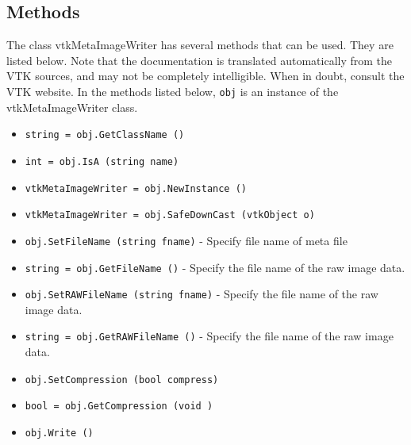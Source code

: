 \subsection{Methods}

The class vtkMetaImageWriter has several methods that can be used.
  They are listed below.
Note that the documentation is translated automatically from the VTK sources,
and may not be completely intelligible.  When in doubt, consult the VTK website.
In the methods listed below, \verb|obj| is an instance of the vtkMetaImageWriter class.
\begin{itemize}
\item  \verb|string = obj.GetClassName ()|

\item  \verb|int = obj.IsA (string name)|

\item  \verb|vtkMetaImageWriter = obj.NewInstance ()|

\item  \verb|vtkMetaImageWriter = obj.SafeDownCast (vtkObject o)|

\item  \verb|obj.SetFileName (string fname)| -  Specify file name of meta file

\item  \verb|string = obj.GetFileName ()| -  Specify the file name of the raw image data.

\item  \verb|obj.SetRAWFileName (string fname)| -  Specify the file name of the raw image data.

\item  \verb|string = obj.GetRAWFileName ()| -  Specify the file name of the raw image data.

\item  \verb|obj.SetCompression (bool compress)|

\item  \verb|bool = obj.GetCompression (void )|

\item  \verb|obj.Write ()|

\end{itemize}
